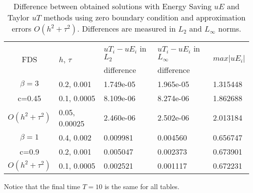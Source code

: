 \documentclass{article}
\begin{document}
\begin{table}[ht]
\centering
\small
		\begin{tabular}{||c|l|l|l|l||}
			\hline
			\hline
      \multirow{2  }{*}{FDS}        & \multirow{2  }{*}{$h$, $\tau$}  &   $uT_i - uE_i$  in $L_2$     &  $uT_i - uE_i$ in $L_\infty$ & \multirow{2  }{*}{$max|uE_i|$} \\
	                                        &                                                     &      difference                     &           difference                  &                                                       \\
   			\hline 
					\hline 
  $\beta=3$                   &0.2, 0.001         &  1.749e-05      &  1.965e-05  & 1.315448     \\
   c=0.45                        &0.1, 0.0005        &  8.109e-06       & 8.274e-06 &  1.862688     \\
     $O(h^2 + \tau^ 2)$ &0.05, 0.00025     & 2.460e-06         &2.502e-06  &   2.013184   \\
			\hline 
			\hline 
       $\beta=1$          &0.4, 0.002        & 0.009981     & 0.004560 & 0.656747   \\
                  c=0.9      &0.2, 0.001        & 0.005047      & 0.002373  & 0.673901   \\
  $O(h^2+ \tau^2)$ &0.1, 0.0005         & 0.002521      &0.001117 & 0.672231   \\
			\hline
	   \hline
			\hline 
		\end{tabular}
		\caption{Difference between obtained solutions with Energy Saving $uE$ and Taylor $uT$ methods using zero boundary condition and approximation errors $O(h^{2} + \tau^2 )$. Differences are measured in $L_2$ and $L_\infty$ norms.}
\label{tableF}
\end{table}

Notice that the final time $T=10$  is the same for all tables.
\end{document}
